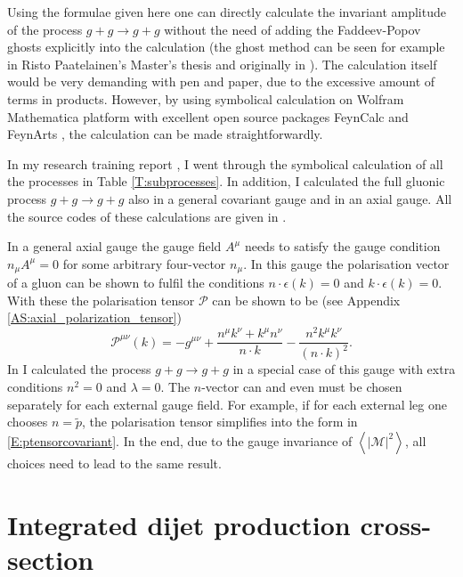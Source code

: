 \documentclass[a4paper, twoside, english, 12pt]{report}
\begin{document}
Using the formulae given here one can directly calculate the invariant amplitude of the process $g+g\rightarrow g+g$ without the need of adding the Faddeev-Popov ghosts explicitly into the calculation (the ghost method can be seen for example in Risto Paatelainen's Master's thesis \cite{RiPa} and originally in \cite{Cutler}). The calculation itself would be very demanding with pen and paper, due to the excessive amount of terms in products. However, by using symbolical calculation on Wolfram Mathematica platform with excellent open source packages FeynCalc \cite{FCalc1, FCalc2} and FeynArts \cite{FArts}, the calculation can be made straightforwardly. 

In my research training report \cite{erkka}, I went through the symbolical calculation of all the processes in Table \ref{T:subprocesses}. In addition, I calculated the full gluonic process $g+g\rightarrow g+g$ also in a general covariant gauge and in an axial gauge. All the source codes of these calculations are given in \cite{erkkakoodit}.

In a general axial gauge the gauge field $A^\mu$ needs to satisfy the gauge condition $n_\mu A^\mu=0$ for some arbitrary four-vector $n_\mu$. In this gauge the polarisation vector of a gluon can be shown to fulfil the conditions $n\cdot\epsilon(k)=0$ and $k\cdot\epsilon(k)=0$. With these the polarisation tensor $\mathcal{P}$ can be shown to be (see Appendix \ref{AS:axial_polarization_tensor})
\begin{equation}
\mathcal{P}^{\mu\nu} (k) =  -g^{\mu\nu} +\frac{n^\mu k^\nu+k^\mu n^\nu}{n\cdot k} -\frac{n^2 k^\mu k^\nu}{(n\cdot k)^2}.
\end{equation}
In \cite{erkka} I calculated the process $g+g\rightarrow g+g$ in a special case of this gauge with extra conditions $n^2=0$ and $\lambda=0$. The $n$-vector can and even must be chosen separately for each external gauge field. For example, if for each external leg one chooses $n=\tilde{p}$, the polarisation tensor simplifies into the form in \eqref{E:ptensorcovariant}. In the end, due to the gauge invariance of $\left\langle|\mathcal{M}|^2\right\rangle$, all choices need to lead to the same result.



\section{Integrated dijet production cross-section}\label{SS:integrated_cross_sections}
\end{document}
